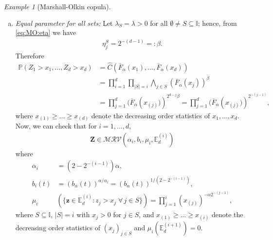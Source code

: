 \documentclass[aos]{imsart}
\numberwithin{equation}{section}
\theoremstyle{plain} %
\theoremstyle{remark}
\newtheorem{example}[theorem]{Example}
\newcommand{\E}{\mathbb{E}}
\renewcommand\P{\mathbb{P}}
\def\MRV{\mathcal{MRV}}
\def\bZ{\boldsymbol Z}
\def\bz{\boldsymbol z}
\begin{document}
\begin{example}[Marshall-Olkin copula]
\begin{enumerate}[(a)]
    \item \emph{Equal parameter for all sets:} Let $\lambda_S=\lambda>0$ for all $\emptyset\neq S\subseteq \mathbb{I}$; hence, from \eqref{eq:MO:eta} we have \begin{align}\label{def:beta}
        \eta_j^S=2^{-(d-1)} =: \beta.
    \end{align} Therefore
    \begin{align*}
       \P(Z_1 > x_1,\ldots, Z_d > x_d) & = \widehat{C}(\overline{F}_{\alpha}(x_1), \ldots, \overline{F}_{\alpha}(x_d))\\
       & = \prod_{i=1}^d \prod_{|S|=i} \bigwedge_{j\in S} (\overline{F}_{\alpha}(x_j))^{\beta}\\
       & = \prod_{j=1}^d (\overline{F}_{\alpha}\left(x_{(j)})\right)^{2^{d-j}\beta} = \prod_{j=1}^d (\overline{F}_{\alpha}\left(x_{(j)})\right)^{2^{-(j-1)}},
    \end{align*}
    where $x_{(1)}\ge \ldots \ge x_{(d)}$ denote the decreasing order statistics of $x_1, \ldots, x_d$. Now, we can check that for $i=1,\ldots, d$,
    \begin{align*} %
    \bZ\in \MRV(\alpha_i, b_i, \mu_i,\E_d^{(i)})
\end{align*}
where
\begin{equation}\label{eq:MO:alphakbkmukeq}
\begin{aligned}
  \alpha_i &=(2-2^{-(i-1)})\alpha,\\
  b_i(t) &= (b_{\alpha}(t))^{\alpha/\alpha_i} = (b_{\alpha}(t))^{1/(2-2^{-(i-1)})},\\
   \mu_i & \left( \{\bz \in \E_d^{(i)}:z_j>x_j\;\forall\, j\in S\}\right) =\prod_{j=1}^i \left({{x}_{(j)}}\right)^{-\alpha2^{-(j-1)}},
\end{aligned}
\end{equation}
where $S\subseteq \mathbb{I}$, $|S|=i$ with $x_j>0$ for $j\in S$, and ${x}_{(1)}\ge \ldots \ge {x}_{(i)}$ denote the decreasing order statistics of $(x_j)_{j\in S}$
 and $\mu_i(\E_d^{(i+1)})=0$.


\end{enumerate}
\end{example}
\end{document}
